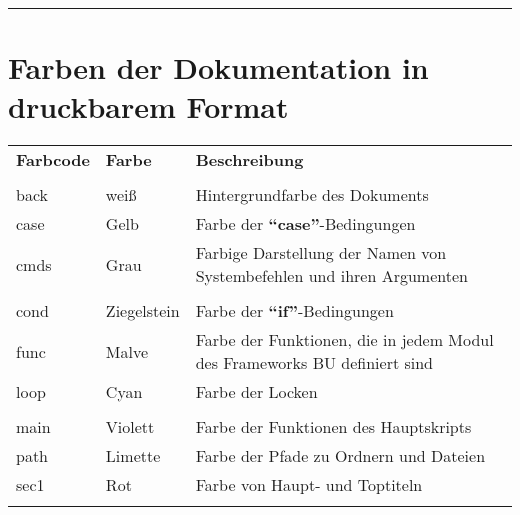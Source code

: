 \documentclass[a4paper,10pt]{article}
\begin{document}
    \newpage





    \color{sec1}\par\noindent\rule{\textwidth}{0.4pt}\color{text}

    \color{red}
    \section{Farben der Dokumentation in druckbarem Format}\color{text}

    \begin{justify}
        \begin{tabular}{lll}
            \textbf{Farbcode} & \textbf{Farbe}          & \textbf{Beschreibung}\\\\

            \color{text}back  & \color{text}weiß        & \color{text}Hintergrundfarbe des Dokuments\\
            \color{case}case  & \color{case}Gelb        & \color{case}Farbe der \textbf{``case''}-Bedingungen\\
            \color{cmds}cmds  & \color{cmds}Grau        & \color{cmds}Farbige Darstellung der Namen von Systembefehlen und ihren Argumenten\\\\

            \color{cond}cond  & \color{cond}Ziegelstein & \color{cond}Farbe der \textbf{``if''}-Bedingungen\\
            \color{func}func  & \color{func}Malve       & \color{func}Farbe der Funktionen, die in jedem Modul des Frameworks BU definiert sind\\
            \color{loop}loop  & \color{loop}Cyan        & \color{loop}Farbe der Locken\\\\

            \color{main}main  & \color{main}Violett     & \color{main}Farbe der Funktionen des Hauptskripts\\
            \color{path}path  & \color{path}Limette     & \color{path}Farbe der Pfade zu Ordnern und Dateien\\
            \color{sec1}sec1  & \color{sec1}Rot         & \color{sec1}Farbe von Haupt- und Toptiteln\\\\


\end{tabular}
\end{justify}
\end{document}
